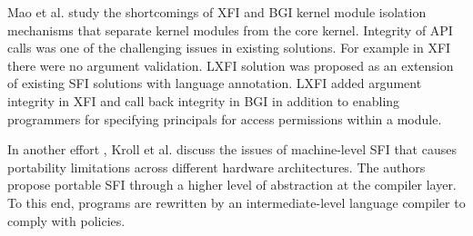 Mao et al. \cite{LXFI} study the shortcomings of XFI \cite{XFI} and
BGI \cite{Castro-BGI} kernel module isolation mechanisms that separate
kernel modules from the core kernel. Integrity of API calls was one of
the challenging issues in existing solutions. For example in XFI there
were no argument validation. LXFI solution was proposed as an
extension of existing SFI solutions with language annotation. LXFI
added argument integrity in XFI and call back integrity in BGI in
addition to enabling programmers for specifying principals for access
permissions within a module.

In another effort \cite{PSFI}, Kroll et al. discuss the issues of
machine-level SFI that causes portability limitations across different
hardware architectures. The authors propose portable SFI through a
higher level of abstraction at the compiler layer. To this end,
programs are rewritten by an intermediate-level language compiler to
comply with policies.



